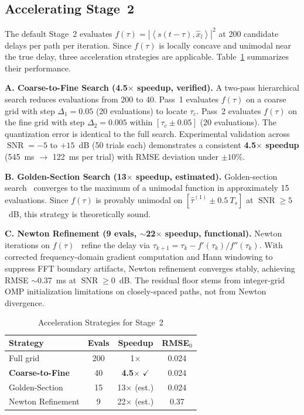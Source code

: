 \documentclass[a4paper,fleqn]{cas-dc}
\DeclareMathOperator{\SNR}{SNR}
\newcommand{\inner}[2]{\left\langle #1, #2 \right\rangle}
\newcommand{\hb}[1]{\hat{#1}}
\begin{document}
\subsection{Accelerating Stage~2}
\label{sec:accelerate}

The default Stage~2 evaluates $f(\tau) = |\inner{s(t-\tau)}{\hb{x}_l}|^2$ at 200 candidate delays per path per iteration. Since $f(\tau)$ is locally concave and unimodal near the true delay, three acceleration strategies are applicable. Table~\ref{tab:accel} summarizes their performance.

\textbf{A. Coarse-to-Fine Search (4.5$\times$ speedup, verified).} A two-pass hierarchical search reduces evaluations from 200 to 40. Pass~1 evaluates $f(\tau)$ on a coarse grid with step $\Delta_1 = 0.05$ (20 evaluations) to locate $\tau_c$. Pass~2 evaluates $f(\tau)$ on the fine grid with step $\Delta_2 = 0.005$ within $[\tau_c \pm 0.05]$ (20 evaluations). The quantization error is identical to the full search. Experimental validation across $\SNR = -5$ to $+15$~dB (50 trials each) demonstrates a consistent \textbf{4.5$\times$ speedup} (\SI{545}{ms} $\to$ \SI{122}{ms} per trial) with RMSE deviation under $\pm 10\%$.

\textbf{B. Golden-Section Search (13$\times$ speedup, estimated).} Golden-section search~\cite{kiefer1953} converges to the maximum of a unimodal function in approximately 15 evaluations. Since $f(\tau)$ is provably unimodal on $[\hat{\tau}^{(1)} \pm 0.5\ T_s]$ at $\SNR \ge 5$~dB, this strategy is theoretically sound.

\textbf{C. Newton Refinement (9 evals, $\sim$22$\times$ speedup, functional).} Newton iterations on $f(\tau)$~\cite{mamandipoor2016} refine the delay via $\tau_{k+1}=\tau_k - f'(\tau_k)/f''(\tau_k)$. With corrected frequency-domain gradient computation and Hann windowing to suppress FFT boundary artifacts, Newton refinement converges stably, achieving RMSE $\sim$0.37~ms at $\SNR\ge 0$~dB. The residual floor stems from integer-grid OMP initialization limitations on closely-spaced paths, not from Newton divergence.

\begin{table}[cols=4,pos=htbp]
\centering
\caption{Acceleration Strategies for Stage~2}
\label{tab:accel}
\footnotesize
\begin{tabular}{@{}lccc@{}}
\toprule
Strategy & Evals & Speedup & RMSE$_0$ \\
\midrule
Full grid & 200 & 1$\times$ & 0.024 \\
\textbf{Coarse-to-Fine} & 40 & \textbf{4.5}$\times$ $\checkmark$ & 0.024 \\
Golden-Section & 15 & 13$\times$ (est.) & 0.024 \\
Newton Refinement & 9 & 22$\times$ (est.) & 0.37 \\
\bottomrule
\end{tabular}
\end{table}
\end{document}
